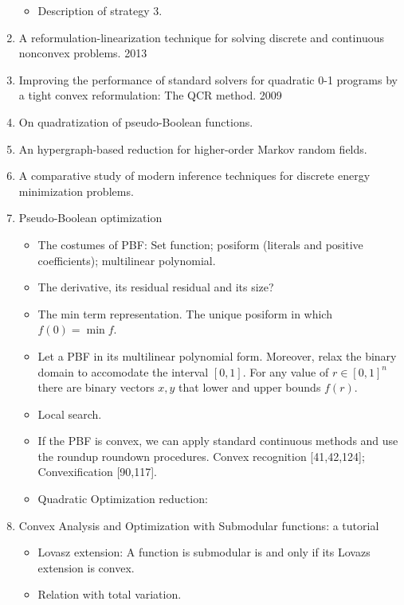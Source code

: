 \begin{enumerate}
\begin{itemize}
		\item{Description of strategy 3.}
	\end{itemize}
	\item{A reformulation-linearization technique for solving discrete and continuous nonconvex problems. 2013}
	\item{Improving the performance of standard solvers for quadratic 0-1 programs by a tight convex reformulation: The QCR method. 2009}
	\item{On quadratization of pseudo-Boolean functions.}
	\item{An hypergraph-based reduction for higher-order Markov
random fields.}
	\item{A comparative study of modern inference techniques for discrete energy minimization problems.}
	\item{Pseudo-Boolean optimization}
	\begin{itemize}
		\item{The costumes of PBF: Set function; posiform (literals and positive coefficients); multilinear polynomial.}
		\item{The derivative, its residual residual and its size?}
		\item{The min term representation. The unique posiform in which $f(0) = \min f$.}
		\item{Let a PBF in its multilinear polynomial form. Moreover, relax the binary domain to accomodate the interval $[0,1]$. For any value of $r \in [0,1]^n$ there are binary vectors $x,y$ that lower and upper bounds $f(r)$. }
		\item{Local search.}
		\item{If the PBF is convex, we can apply standard continuous methods and use the roundup roundown procedures. Convex recognition [41,42,124]; Convexification [90,117].}
		\item{Quadratic Optimization reduction: }
	\end{itemize}
	\item{Convex Analysis and Optimization with Submodular functions: a tutorial}
	\begin{itemize}
	\item{Lovasz extension: A function is submodular is and only if its Lovazs extension is convex.}
	\item{Relation with total variation.}
	\end{itemize}
\end{enumerate}


